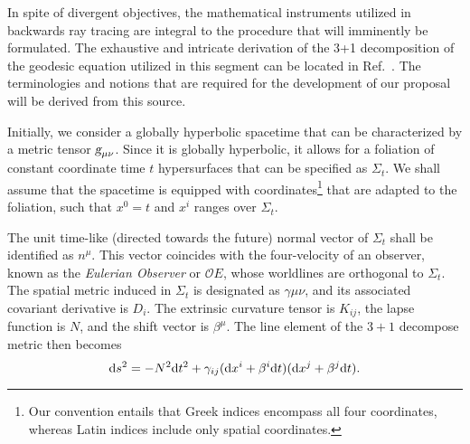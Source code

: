 In spite of divergent objectives, the mathematical instruments utilized in backwards ray tracing are integral to the procedure that will imminently be formulated. The exhaustive and intricate derivation of the 3+1 decomposition of the geodesic equation utilized in this segment can be located in Ref.~\cite{Vincent_2012}. The terminologies and notions that are required for the development of our proposal will be derived from this source. 

Initially, we consider a globally hyperbolic spacetime that can be characterized by a metric tensor $\mtrtens{\mu}{\nu}$. Since it is globally hyperbolic, it allows for a foliation of constant coordinate time $t$ hypersurfaces that can be specified as $\Sigma_t$. We shall assume that the spacetime is equipped with coordinates\footnote{Our convention entails that Greek indices encompass all four coordinates, whereas Latin indices include only spatial coordinates.} that are adapted to the foliation, such that $x^0=t$ and $x^i$ ranges over $\Sigma_t$.

The unit time-like (directed towards the future) normal vector of $\Sigma_t$ shall be identified as $n^\mu$. This vector coincides with the four-velocity of an observer, known as the \emph{Eulerian Observer} or $\mathcal{O}E$, whose worldlines are orthogonal to $\Sigma_t$. The spatial metric induced in $\Sigma_t$ is designated as $\gamma{\mu\nu}$, and its associated covariant derivative is $D_i$. The extrinsic curvature tensor is $K_{ij}$, the lapse function is $N$, and the shift vector is $\beta^\mu$. The line element of the $3+1$ decompose metric then becomes
%
\begin{equation}
  \mathrm{d} s^2 = -N^2 \mathrm{d} t^2 + \gamma_{ij}(\mathrm{d} x^i + \beta^i \mathrm{d} t)(\mathrm{d} x^j + \beta^j \mathrm{d} t).
  \label{eq:arbitrary_penrose_decomposed_metric}
\end{equation}

